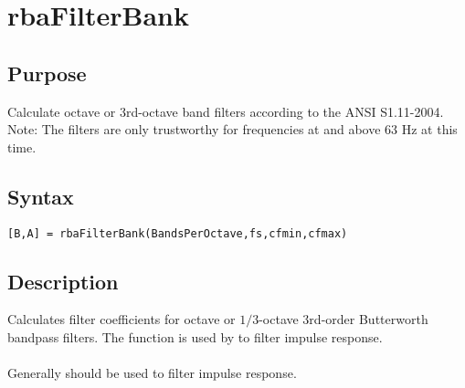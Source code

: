 
\chapter{rbaFilterBank} %
\label{cha:rbaFilterBank} %

\section{Purpose} %
\label{sec:rbaFilterBank_purpose}
Calculate octave or 3rd-octave band filters according to the ANSI S1.11-2004. Note: The filters are only trustworthy for frequencies at and above 63 Hz at this time.


\section{Syntax} %
\label{sec:rbaFilterBank_syntax}

\texttt{[B,A] = rbaFilterBank(BandsPerOctave,fs,cfmin,cfmax)}




\section{Description} %
\label{sec:rbaFilterBank_description}
Calculates filter coefficients for octave or $1/3$-octave 3rd-order Butterworth bandpass filters. The function is used by \texttt{} to filter impulse response.\\
\\
Generally \texttt{} should be used to filter impulse response.




